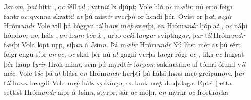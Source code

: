Jsn\textit{om}, þ\textit{at} hitti  , o\textit{c} féll   t\textit{il} ; vatn\textit{it}  lx   djúpt; Vole hló o\textit{c} m\textit{ælir}: nú erto   feigr    f\textit{an}tr  o\textit{c}
qven\textit{n}a  skratti! a\textit{t} þú mist\textit{ir} sv\textit{er}þ\textit{it} or hendi þér.  Ovíst er þ\textit{at}, s\textit{egir} Hróm\textit{undr} Vole vill þá
hỏggva t\textit{il} h\textit{an}s m\textit{eþ} sv\textit{er}þi,  
e\textit{n} Hróm\textit{undr} ljóp a\textit{t} 
, 
o\textit{c} náþi hỏnd\textit{om} u\textit{m} háls  ,  e\textit{n} h\textit{ann} t\textit{óc} á  , urþo   e\textit{ck}i l\textit{an}g\textit{ar} sviptíng\textit{ar}, þ\textit{ar}
t\textit{il}  Hróm\textit{undr} f\textit{ær}þi Vola   lopt upp,   síþ\textit{an}  á Jsin\textit{n}. Þá  m\textit{ælir} Hróm\textit{undr} Nú
lítst mér a\textit{t} þú sért feigr engu síþr  e\textit{n}
e\textit{c}, o\textit{c} skal þér nú a\textit{t} gagni v\textit{er}þa
l\textit{an}gr rógr o\textit{c} ,  líka   e\textit{c}  hugsat þér kaup f\textit{yrir} Hrók
min\textit{n}, s\textit{e}m  þú myrdt\textit{ir}
f\textit{or}þ\textit{om} saklausan\textit{n} af tómri ỏfund v\textit{it}
m\textit{ic}. 
Vole  t\textit{óc} þá a\textit{t} blása    e\textit{n} Hróm\textit{undr} h\textit{er}þti þá   hálsi  h\textit{an}s m\textit{eþ} greipun\textit{om},
þ\textit{ar} t\textit{il}  h\textit{ann} hengdi Vola m\textit{eþ} háls kyrkíngo, o\textit{c} lauk   m\textit{eþ}  dauþdaga.  Ept\textit{ir} þetta settist Hróm\textit{undr}
niþr á Jsin\textit{n}, styrþr, sár o\textit{c} móþr, e\textit{n} myrkr o\textit{c} frosth\textit{ar}ka
